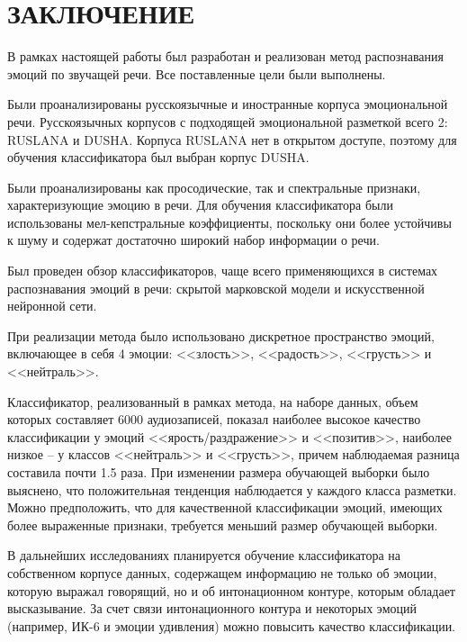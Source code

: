 \part*{ЗАКЛЮЧЕНИЕ}
В рамках настоящей работы был разработан и реализован метод распознавания эмоций по звучащей речи. Все поставленные цели были выполнены.

Были проанализированы русскоязычные и иностранные корпуса эмоциональной речи. Русскоязычных корпусов с подходящей эмоциональной разметкой всего 2: RUSLANA и DUSHA. Корпуса RUSLANA нет в открытом доступе, поэтому для обучения классификатора был выбран корпус DUSHA.

Были проанализированы как просодические, так и спектральные признаки, характеризующие эмоцию в речи. Для обучения классификатора были использованы мел-кепстральные коэффициенты, поскольку они более устойчивы к шуму и содержат достаточно широкий набор информации о речи.

Был проведен обзор классификаторов, чаще всего применяющихся в системах распознавания эмоций в речи: скрытой марковской модели и искусственной нейронной сети.

При реализации метода было использовано дискретное пространство эмоций, включающее в себя 4 эмоции: <<злость>>, <<радость>>, <<грусть>> и <<нейтраль>>. 

Классификатор, реализованный в рамках метода, на наборе данных, объем которых составляет 6000 аудиозаписей, показал наиболее высокое качество классификации у эмоций <<ярость/раздражение>> и <<позитив>>, наиболее низкое -- у классов <<нейтраль>> и <<грусть>>,  причем наблюдаемая разница составила почти 1.5 раза. При изменении размера обучающей выборки было выяснено, что положительная тенденция наблюдается у каждого класса разметки. Можно предположить, что для качественной классификации эмоций, имеющих более выраженные признаки, требуется меньший размер обучающей выборки.


В дальнейших исследованиях планируется обучение классификатора на собственном корпусе данных, содержащем информацию не только об эмоции, которую выражал говорящий, но и об интонационном контуре, которым обладает высказывание. За счет связи интонационного контура и некоторых эмоций (например, ИК-6 и эмоции удивления) можно повысить качество классификации. 